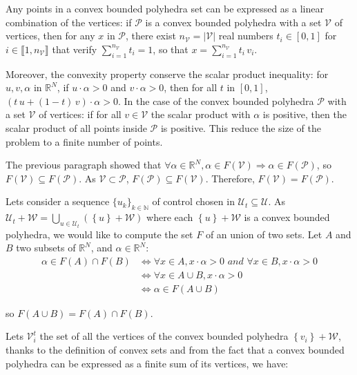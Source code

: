 Any points in a convex bounded polyhedra set can be expressed as a linear combination of the vertices: if $\mathcal{P}$ is a convex bounded polyhedra with a set $\mathcal{V}$ of vertices, then for any $x$ in $\mathcal{P}$, there exist $n_{\mathcal{V}} = \left | \mathcal{V} \right |$ real numbers $t_i \in [0,1]$ for $i \in \llbracket 1,n_{\mathcal{V}} \rrbracket$ that verify $\sum_{i=1}^{n_{\mathcal{V}}} t_i = 1$, so that $x = \sum_{i=1}^{n_{\mathcal{V}}} t_i \, v_i$.

Moreover, the convexity property conserve the scalar product inequality: for $u,v,\alpha$ in $\mathbb{R}^N$, if  $u \cdot \alpha > 0$ and $v \cdot \alpha > 0$, then for all $t$ in $[0,1]$, $ (t \, u + (1-t) \, v ) \cdot \alpha> 0$.
In the case of the convex bounded polyhedra $\mathcal{P}$ with a set $\mathcal{V}$ of vertices: if for all $v \in \mathcal{V}$ the scalar product with $\alpha$ is positive, then the scalar product of all points inside $\mathcal{P}$ is positive. This reduce the size of the problem to a finite number of points.

The previous paragraph showed that $\forall \alpha \in \mathbb{R}^N, \alpha \in F(\mathcal{V}) \Rightarrow \alpha \in F(\mathcal{P})$, so $F(\mathcal{V}) \subseteq F(\mathcal{P})$. As $\mathcal{V} \subset \mathcal{P}$, $F(\mathcal{P}) \subseteq F(\mathcal{V})$. Therefore, $F(\mathcal{V}) = F(\mathcal{P})$.

Lets consider a sequence $\{u_k\}_{k \in \mathbb{N}}$ of control chosen in  $\mathcal{U}_t \subseteq \mathcal{U}$.
As $\mathcal{U}_t + \mathcal{W} = \bigcup_{ u \in \mathcal{U}_t}\left ( \left \{ u \right\} + \mathcal{W} \right )$ where each $\left \{ u \right\} + \mathcal{W}$ is a convex bounded polyhedra, we would like to compute the set $F$ of an union of two sets.
Let $A$ and $B$ two subsets of $\mathbb{R}^N$, and $\alpha \in\mathbb{R}^N$:
\begin{equation}\label{Funion}
\begin{aligned}
  \alpha \in F(A) \cap F(B) & \Leftrightarrow \forall x \in A,x \cdot \alpha > 0 \textit{ and } \forall x \in B,x \cdot \alpha > 0
  \\ & \Leftrightarrow \forall x \in A \cup B,x \cdot \alpha > 0
  \\ & \Leftrightarrow \alpha \in F(A \cup B)
\end{aligned}
\end{equation}

so $F(A \cup B) = F(A) \cap F(B)$.

Lets $\mathcal{V}^t_i$ the set of all the vertices of the convex bounded polyhedra $\left \{ v_i \right \} + \mathcal{W}$, thanks to the definition of convex sets and from the fact that a convex bounded polyhedra can be expressed as a finite sum of its vertices, we have:


